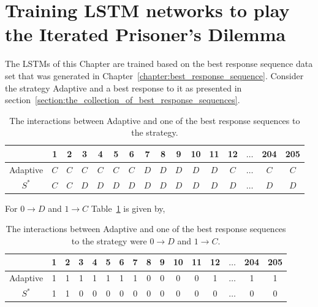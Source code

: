 \section{Training LSTM networks to play the Iterated Prisoner's Dilemma}\label{section:training_a_rnn}

The LSTMs of this Chapter are trained based on the best response sequence
data set that was generated in Chapter~\ref{chapter:best_response_sequence}.
Consider the strategy Adaptive and a best response to it as presented in
section~\ref{section:the_collection_of_best_response_sequences}.

\begin{table}[htb]
    \centering
    \begin{tabular}{cccccccccccccccc}
        & \textbf{1} & \textbf{2} & \textbf{3} & \textbf{4}  & \textbf{5} & \textbf{6} & \textbf{7} & \textbf{8} & \textbf{9} & \textbf{10} & \textbf{11}  & \textbf{12} &  \(\dots\)  & \textbf{204} &  \textbf{205} \\ 
        \midrule
        Adaptive & \(C\) & \(C\) & \(C\) & \(C\) & \(C\) & \(C\) & \(D\) & \(D\) & \(D\) & \(D\) & \(D\)& \(C\)& \(\dots\) & \(C\) & \(C\) \\
        \(S^*\) & \(C\) & \(C\) & \(D\) & \(D\) & \(D\) & \(D\) & \(D\) & \(D\) & \(D\) & \(D\) & \(D\) & \(D\)& \(\dots\) & \(D\) & \(D\) \\ \bottomrule
    \end{tabular}
    \caption{The interactions between Adaptive and one of the best response sequences
    to the strategy.}\label{table:adaptive_vs_best_response}
    \end{table}

For \(0 \to D\) and \(1 \to C\) Table~\ref{table:adaptive_vs_best_response} is given by,

\begin{table}[htbp]
    \centering
    \begin{tabular}{cccccccccccccccc}
        & \textbf{1} & \textbf{2} & \textbf{3} & \textbf{4}  & \textbf{5} & \textbf{6} & \textbf{7} & \textbf{8} & \textbf{9} & \textbf{10} & \textbf{11} &  \textbf{12} & \(\dots\)  & \textbf{204} &  \textbf{205} \\ 
        \midrule
        Adaptive & 1 & 1 & 1 & 1 & 1 & 1 & 1 & 0 & 0 & 0 & 0& 1& \(\dots\) & 1 & 1 \\
        \(S^*\) & 1 & 1 & 0 & 0 & 0 & 0 & 0 & 0 & 0 & 0 & 0 & 0& \(\dots\) & 0 & 0 \\ \bottomrule
    \end{tabular}
    \caption{The interactions between Adaptive and one of the best response sequences
    to the strategy were \(0 \to D\) and \(1 \to C\).}\label{table:adaptive_vs_best_response_binary}
\end{table}

